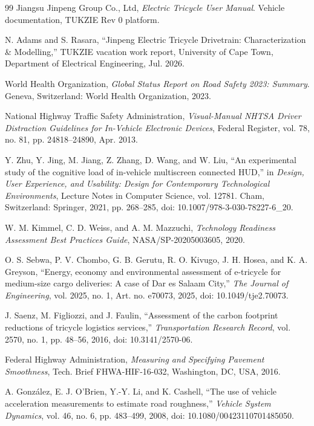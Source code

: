 \begin{thebibliography}{99}
 Jiangsu Jinpeng Group Co., Ltd, \emph{Electric Tricycle User Manual}. Vehicle documentation, TUKZIE Rev 0 platform.

 N. Adams and S. Rasara, ``Jinpeng Electric Tricycle Drivetrain: Characterization \& Modelling,'' TUKZIE vacation work report, University of Cape Town, Department of Electrical Engineering, Jul. 2026.

 World Health Organization, \emph{Global Status Report on Road Safety 2023: Summary}. Geneva, Switzerland: World Health Organization, 2023.

 National Highway Traffic Safety Administration, \emph{Visual-Manual NHTSA Driver Distraction Guidelines for In-Vehicle Electronic Devices}, Federal Register, vol. 78, no. 81, pp. 24818--24890, Apr. 2013.

 Y. Zhu, Y. Jing, M. Jiang, Z. Zhang, D. Wang, and W. Liu, ``An experimental study of the cognitive load of in-vehicle multiscreen connected HUD,'' in \emph{Design, User Experience, and Usability: Design for Contemporary Technological Environments}, Lecture Notes in Computer Science, vol. 12781. Cham, Switzerland: Springer, 2021, pp. 268--285, doi: 10.1007/978-3-030-78227-6\_20.

 W. M. Kimmel, C. D. Weiss, and A. M. Mazzuchi, \emph{Technology Readiness Assessment Best Practices Guide}, NASA/SP-20205003605, 2020.

 O. S. Sebwa, P. V. Chombo, G. B. Gerutu, R. O. Kivugo, J. H. Hosea, and K. A. Greyson, ``Energy, economy and environmental assessment of e-tricycle for medium-size cargo deliveries: A case of Dar es Salaam City,'' \emph{The Journal of Engineering}, vol. 2025, no. 1, Art. no. e70073, 2025, doi: 10.1049/tje2.70073.

 J. Saenz, M. Figliozzi, and J. Faulin, ``Assessment of the carbon footprint reductions of tricycle logistics services,'' \emph{Transportation Research Record}, vol. 2570, no. 1, pp. 48--56, 2016, doi: 10.3141/2570-06.

 Federal Highway Administration, \emph{Measuring and Specifying Pavement Smoothness}, Tech. Brief FHWA-HIF-16-032, Washington, DC, USA, 2016.

 A. Gonz\'alez, E. J. O'Brien, Y.-Y. Li, and K. Cashell, ``The use of vehicle acceleration measurements to estimate road roughness,'' \emph{Vehicle System Dynamics}, vol. 46, no. 6, pp. 483--499, 2008, doi: 10.1080/00423110701485050.


\end{thebibliography}
